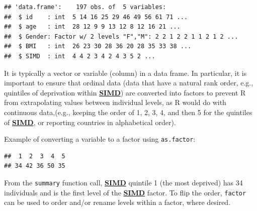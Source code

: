 \documentclass[
]{book}
\newenvironment{Shaded}{\begin{snugshade}}{\end{snugshade}}
\newcommand{\CommentTok}[1]{\textcolor[rgb]{0.56,0.35,0.01}{\textit{#1}}}
\newcommand{\FunctionTok}[1]{\textcolor[rgb]{0.13,0.29,0.53}{\textbf{#1}}}
\newcommand{\NormalTok}[1]{#1}
\newcommand{\OtherTok}[1]{\textcolor[rgb]{0.56,0.35,0.01}{#1}}
\newcommand{\SpecialCharTok}[1]{\textcolor[rgb]{0.81,0.36,0.00}{\textbf{#1}}}
\newcommand{\StringTok}[1]{\textcolor[rgb]{0.31,0.60,0.02}{#1}}
\begin{document}
\begin{verbatim}
## 'data.frame':    197 obs. of  5 variables:
##  $ id    : int  5 14 16 25 29 46 49 56 61 71 ...
##  $ age   : int  28 12 9 9 13 12 8 12 16 21 ...
##  $ Gender: Factor w/ 2 levels "F","M": 2 2 1 2 2 1 1 2 1 2 ...
##  $ BMI   : int  26 23 30 28 36 20 28 35 33 38 ...
##  $ SIMD  : int  4 4 2 3 4 2 4 3 5 2 ...
\end{verbatim}

It is typically a vector or variable (column) in a data frame. In particular, it is important to ensure that ordinal data (data that have a natural rank order, e.g., quintiles of deprivation within \textbf{\hyperref[acronyms_SIMD]{SIMD}}) are converted into factors to prevent R from extrapolating values between individual levels, as R would do with continuous data,(e.g., keeping the order of 1, 2, 3, 4, and then 5 for the quintiles of \textbf{\hyperref[acronyms_SIMD]{SIMD}}, or reporting countries in alphabetical order).

Example of converting a variable to a factor using \texttt{as.factor}:

\begin{Shaded}
\end{Shaded}

\begin{verbatim}
##  1  2  3  4  5 
## 34 42 36 50 35
\end{verbatim}

From the \texttt{summary} function call, \textbf{\hyperref[acronyms_SIMD]{SIMD}} quintile 1 (the most deprived) has 34 individuals and is the first level of the \textbf{\hyperref[acronyms_SIMD]{SIMD}} factor. To flip the order, \texttt{factor} can be used to order and/or rename levels within a factor, where desired.
\end{document}
